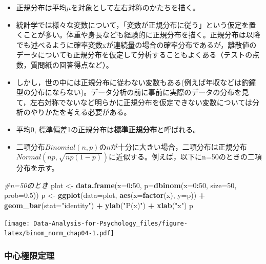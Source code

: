 \documentclass[]{article}
\newenvironment{Shaded}{\begin{snugshade}}{\end{snugshade}}
\newcommand{\KeywordTok}[1]{\textcolor[rgb]{0.13,0.29,0.53}{\textbf{#1}}}
\newcommand{\DataTypeTok}[1]{\textcolor[rgb]{0.13,0.29,0.53}{#1}}
\newcommand{\DecValTok}[1]{\textcolor[rgb]{0.00,0.00,0.81}{#1}}
\newcommand{\FloatTok}[1]{\textcolor[rgb]{0.00,0.00,0.81}{#1}}
\newcommand{\StringTok}[1]{\textcolor[rgb]{0.31,0.60,0.02}{#1}}
\newcommand{\CommentTok}[1]{\textcolor[rgb]{0.56,0.35,0.01}{\textit{#1}}}
\newcommand{\OperatorTok}[1]{\textcolor[rgb]{0.81,0.36,0.00}{\textbf{#1}}}
\newcommand{\NormalTok}[1]{#1}
\begin{document}
\begin{itemize}
\item
  正規分布は平均\(\mu\)を対象として左右対称のかたちを描く。
\item
  統計学では様々な変数について，「変数が正規分布に従う」という仮定を置くことが多い。体重や身長なども経験的に正規分布を描く。正規分布は以降でも述べるように確率変数xが連続量の場合の確率分布であるが，離散値のデータについても正規分布を仮定して分析することもよくある（テストの点数，質問紙の回答得点など）。
\item
  しかし，世の中には正規分布に従わない変数もある(例えば年収などは釣鐘型の分布にならない)。データ分析の前に事前に実際のデータの分布を見て，左右対称でないなど明らかに正規分布を仮定できない変数については分析のやりかたを考える必要がある。
\item
  平均0, 標準偏差1の正規分布は\textbf{標準正規分布}と呼ばれる。
\item
  二項分布\(Binomial(n, p)\)の\(n\)が十分に大きい場合，二項分布は正規分布\(Normal(np, \sqrt{np(1-p)})\)に近似する。例えば，以下にn=50のときの二項分布を示す。
\end{itemize}

\begin{Shaded}
\begin{Highlighting}[]
\CommentTok{#n=50のとき}
\NormalTok{plot <-}\StringTok{ }\KeywordTok{data.frame}\NormalTok{(}\DataTypeTok{x=}\DecValTok{0}\OperatorTok{:}\DecValTok{50}\NormalTok{, }\DataTypeTok{p=}\KeywordTok{dbinom}\NormalTok{(}\DataTypeTok{x=}\DecValTok{0}\OperatorTok{:}\DecValTok{50}\NormalTok{, }\DataTypeTok{size=}\DecValTok{50}\NormalTok{, }\DataTypeTok{prob=}\FloatTok{0.5}\NormalTok{))}
\NormalTok{p <-}\StringTok{ }\KeywordTok{ggplot}\NormalTok{(}\DataTypeTok{data=}\NormalTok{plot, }\KeywordTok{aes}\NormalTok{(}\DataTypeTok{x=}\KeywordTok{factor}\NormalTok{(x), }\DataTypeTok{y=}\NormalTok{p)) }\OperatorTok{+}\StringTok{ }\KeywordTok{geom_bar}\NormalTok{(}\DataTypeTok{stat=}\StringTok{"identity"}\NormalTok{) }\OperatorTok{+}\StringTok{ }\KeywordTok{ylab}\NormalTok{(}\StringTok{"P(x)"}\NormalTok{) }\OperatorTok{+}\StringTok{ }\KeywordTok{xlab}\NormalTok{(}\StringTok{"x"}\NormalTok{)}
\NormalTok{p}
\end{Highlighting}
\end{Shaded}

\texttt{[image: Data-Analysis-for-Psychology\_files/figure-latex/binom\_norm\_chap04-1.pdf]}

\subsubsection{中心極限定理}
\end{document}
